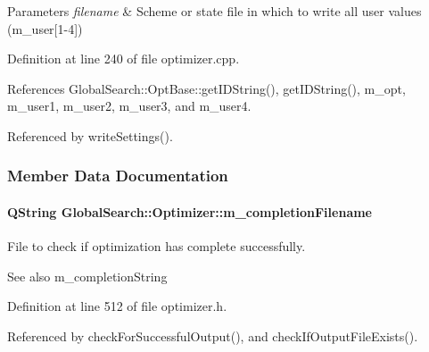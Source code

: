 \begin{DoxyParams}{Parameters}
{\em filename} & Scheme or state file in which to write all user values (m\+\_\+user\mbox{[}1-\/4\mbox{]}) \\
\hline
\end{DoxyParams}


Definition at line 240 of file optimizer.\+cpp.



References Global\+Search\+::\+Opt\+Base\+::get\+I\+D\+String(), get\+I\+D\+String(), m\+\_\+opt, m\+\_\+user1, m\+\_\+user2, m\+\_\+user3, and m\+\_\+user4.



Referenced by write\+Settings().



\subsubsection{Member Data Documentation}
\hypertarget{classGlobalSearch_1_1Optimizer_a5e7a476823bc2d4b63939a9ada4f8ed0}{}
\paragraph[{m\+\_\+completion\+Filename}]{\setlength{\rightskip}{0pt plus 5cm}Q\+String Global\+Search\+::\+Optimizer\+::m\+\_\+completion\+Filename\hspace{0.3cm}{\ttfamily [protected]}}\label{classGlobalSearch_1_1Optimizer_a5e7a476823bc2d4b63939a9ada4f8ed0}
File to check if optimization has complete successfully. \begin{DoxySeeAlso}{See also}
m\+\_\+completion\+String 
\end{DoxySeeAlso}


Definition at line 512 of file optimizer.\+h.



Referenced by check\+For\+Successful\+Output(), and check\+If\+Output\+File\+Exists().

\hypertarget{classGlobalSearch_1_1Optimizer_a65ee33ee8778c366e8b197e75ae8e674}{}

